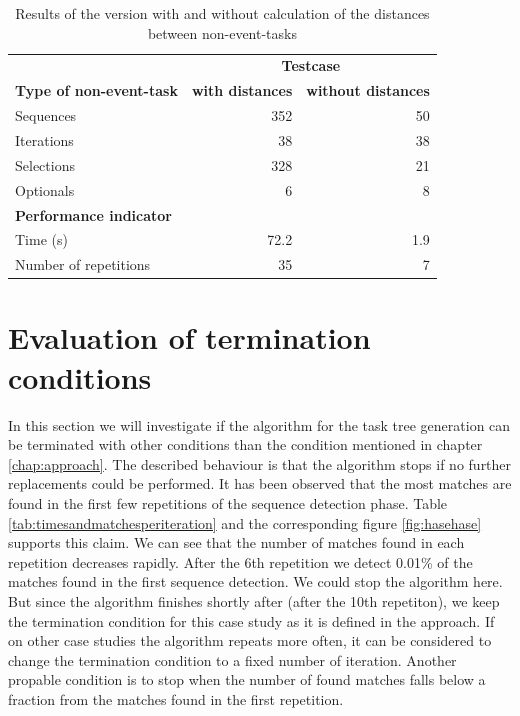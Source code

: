 \begin{table}[h]
	\centering
	\begin{tabular}{l r r}
		\toprule
		&  \multicolumn{2}{c}{\textbf{Testcase}} \\
		\cmidrule{2-3}
		\textbf{Type of non-event-task}& \textbf{with distances}& \textbf{without distances} \\
		\midrule
		Sequences & 352 & 50 \\
		Iterations& 38  & 38 \\
		Selections& 328 & 21 \\
		Optionals & 6   & 8  \\
		\midrule
		\textbf{Performance indicator} & & \\
		\midrule
		Time (s)     & 72.2 & 1.9 \\
		Number of repetitions & 35 & 7\\
		\bottomrule
	\end{tabular}
	\caption{Results of the version with and without calculation of the distances between non-event-tasks}
	\label{tab:resultsnoneventtasks}
\end{table}

\section{Evaluation of termination conditions}
In this section we will investigate if the algorithm for the task tree generation can be terminated with other conditions than the condition mentioned in chapter \ref{chap:approach}.
The described behaviour is that the algorithm stops if no further replacements could be performed.
It has been observed that the most matches are found in the first few repetitions of the sequence detection phase.
Table \ref{tab:timesandmatchesperiteration} and the corresponding figure \ref{fig:hasehase} supports this claim. We can see that the number of matches found in each repetition decreases rapidly.
After the 6th repetition we detect 0.01\% of the matches found in the first sequence detection. We could stop the algorithm here. But since the algorithm finishes shortly after (after the 10th repetiton),
we keep the termination condition for this case study as it is defined in the approach.
If on other case studies the algorithm repeats more often, it can be considered to change the termination condition to a fixed number of iteration.
Another propable condition is to stop when the number of found matches falls below a fraction from the matches found in the first repetition.

